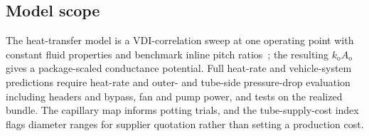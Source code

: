 \subsection{Model scope}

The heat-transfer model is a VDI-correlation sweep at one operating point with
constant fluid properties and benchmark inline pitch
ratios~\cite{GnielinskiG7,GnielinskiG1}; the resulting
$k_{\mathrm{o}}A_{\mathrm{o}}$ gives a package-scaled conductance potential.
Full heat-rate and vehicle-system predictions require heat-rate and
outer- and tube-side pressure-drop evaluation including
headers and bypass, fan and pump power, and tests on the realized bundle. The
capillary map informs potting trials, and the tube-supply-cost index flags
diameter ranges for supplier quotation rather than setting a production cost.
